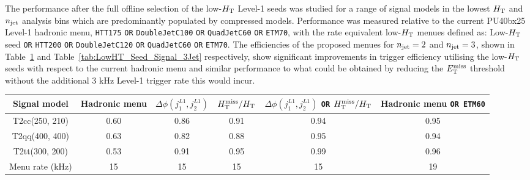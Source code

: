 The performance after the full offline selection of the low-$\mbox{$H_\text{T}$}$ Level-1 seeds was studied for a range of signal models in the lowest $\mbox{$H_\text{T}$}$ and $n_{\text{jet}}$ analysis bins which are predominantly populated by compressed models. Performance was measured relative to the current PU40bx25 Level-1 hadronic menu, {\verb!HTT175! \verb!OR! \verb!DoubleJetC100! \verb!OR! \verb!QuadJetC60! \verb!OR! \verb!ETM70!}, with the rate equivalent low-$\mbox{$H_\text{T}$}$ menues defined as: Low-$\mbox{$H_\text{T}$}$ seed {\verb!OR! \verb!HTT200! \verb!OR! \verb!DoubleJetC120! \verb!OR! \verb!QuadJetC60! \verb!OR! \verb!ETM70!}. The efficiencies of the proposed menues for $n_{\text{jet}} = 2$ and $n_{\text{jet}} = 3$, shown in Table~\ref{tab:LowHT_Seed_Signal_2Jet} and Table~\ref{tab:LowHT_Seed_Signal_3Jet} respectively, show significant improvements in trigger efficiency utilising the low-$\mbox{$H_\text{T}$}$ seeds with respect to the current hadronic menu and similar performance to what could be obtained by reducing the $\mbox{$E_\text{T}^{\rm miss}$}$ threshold without the additional 3 kHz Level-1 trigger rate this would incur.


\begin{table}[h!]
\footnotesize
\centering
\begin{tabular}{cccccc} 
\hline
\hline
  Signal model & Hadronic menu & $\Delta\phi(j_{1}^{L1},j_{2}^{L1})$ & $\mbox{$H_{\rm T}^{\rm miss}$}/\mbox{$H_\text{T}$}$ &$\Delta\phi(j_{1}^{L1},j_{2}^{L1})$ \verb!OR! $\mbox{$H_{\rm T}^{\rm miss}$}/\mbox{$H_\text{T}$}$ & Hadronic menu \verb!OR ETM60! \\
\hline
  T2cc(250, 210)   & 0.60 & 0.86 & 0.91 & 0.94 & 0.95 \\
  T2qq(400, 400)   & 0.63 & 0.82 & 0.88 & 0.95 & 0.94 \\
  T2tt(300, 200)   & 0.53 & 0.91 & 0.95 & 0.99 & 0.96 \\
\hline
  Menu rate (kHz) & 15   & 15   & 15   & 15   & 19   \\
\hline
\hline
\end{tabular}
\label{tab:LowHT_Seed_Signal_2Jet}
\end{table}

